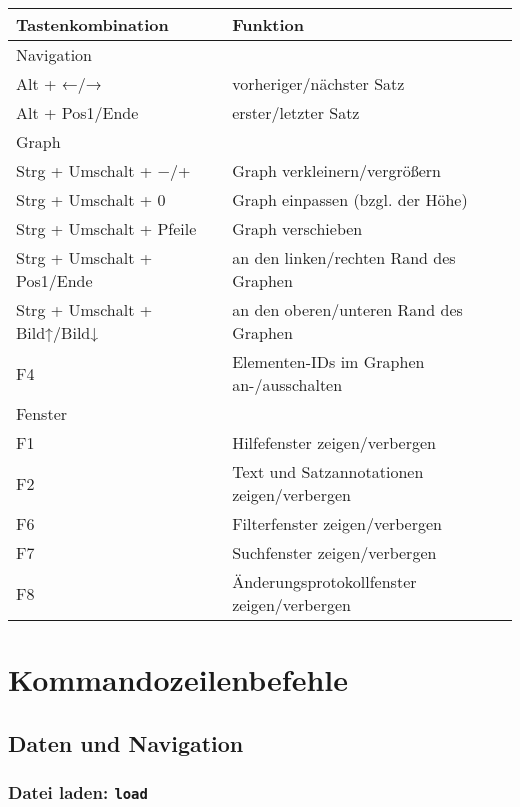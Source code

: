 \documentclass[12pt]{scrartcl}
\begin{document}
\begin{center}
	\begin{tabular*}{\textwidth}{ll}
		\toprule
		Tastenkombination & Funktion \\
		\midrule
		Navigation & \\
		\midrule
			Alt + ←/→ & vorheriger/nächster Satz \\
			Alt + Pos1/Ende & erster/letzter Satz \\
		\midrule
		Graph & \\
		\midrule
			Strg + Umschalt + −/+ & Graph verkleinern/vergrößern \\
			Strg + Umschalt + 0 & Graph einpassen (bzgl. der Höhe) \\
			Strg + Umschalt + Pfeile & Graph verschieben \\
			Strg + Umschalt + Pos1/Ende & an den linken/rechten Rand des Graphen \\
			Strg + Umschalt + Bild↑/Bild↓ & an den oberen/unteren Rand des Graphen \\
			F4 & Elementen-IDs im Graphen an-/ausschalten\\
		\midrule
		Fenster & \\
		\midrule
			F1 & Hilfefenster zeigen/verbergen\\
			F2 & Text und Satzannotationen zeigen/verbergen\\
			F6 & Filterfenster zeigen/verbergen\\
			F7 & Suchfenster zeigen/verbergen\\
			F8 & Änderungsprotokollfenster zeigen/verbergen\\
		\bottomrule
	\end{tabular*}
\end{center}





\section{Kommandozeilenbefehle}

\subsection{Daten und Navigation}

\subsubsection{Datei laden: \texttt{load}}
\end{document}
